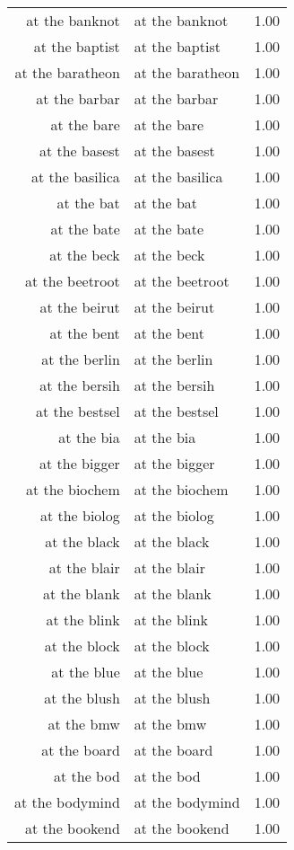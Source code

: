\begin{table}[ht]
\begin{tabular}{rlr}
  at the banknot & at the banknot & 1.00 \\ 
  at the baptist & at the baptist & 1.00 \\ 
  at the baratheon & at the baratheon & 1.00 \\ 
  at the barbar & at the barbar & 1.00 \\ 
  at the bare & at the bare & 1.00 \\ 
  at the basest & at the basest & 1.00 \\ 
  at the basilica & at the basilica & 1.00 \\ 
  at the bat & at the bat & 1.00 \\ 
  at the bate & at the bate & 1.00 \\ 
  at the beck & at the beck & 1.00 \\ 
  at the beetroot & at the beetroot & 1.00 \\ 
  at the beirut & at the beirut & 1.00 \\ 
  at the bent & at the bent & 1.00 \\ 
  at the berlin & at the berlin & 1.00 \\ 
  at the bersih & at the bersih & 1.00 \\ 
  at the bestsel & at the bestsel & 1.00 \\ 
  at the bia & at the bia & 1.00 \\ 
  at the bigger & at the bigger & 1.00 \\ 
  at the biochem & at the biochem & 1.00 \\ 
  at the biolog & at the biolog & 1.00 \\ 
  at the black & at the black & 1.00 \\ 
  at the blair & at the blair & 1.00 \\ 
  at the blank & at the blank & 1.00 \\ 
  at the blink & at the blink & 1.00 \\ 
  at the block & at the block & 1.00 \\ 
  at the blue & at the blue & 1.00 \\ 
  at the blush & at the blush & 1.00 \\ 
  at the bmw & at the bmw & 1.00 \\ 
  at the board & at the board & 1.00 \\ 
  at the bod & at the bod & 1.00 \\ 
  at the bodymind & at the bodymind & 1.00 \\ 
  at the bookend & at the bookend & 1.00 \\ 

\end{tabular}
\end{table}

